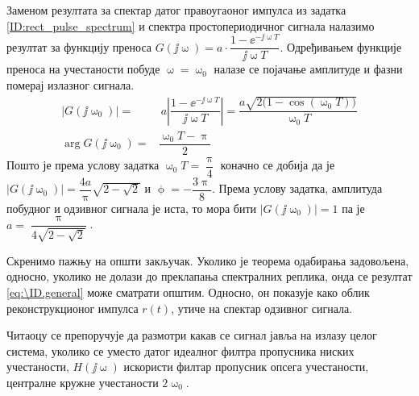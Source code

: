 Заменом резултата за спектар датог правоугаоног импулса из задатка \ref{ID:rect_pulse_spectrum}
и спектра простопериодичног сигнала налазимо резултат за функцију преноса 
${G(\jj\upomega) = a \cdot \dfrac{1 - \ee^{-\jj\upomega T} }{\jj\upomega T}}$. Одређивањем функције преноса на учестаности
побуде $\upomega = \upomega_0$ налазе се појачање амплитуде и фазни померај излазног сигнала.  
\begin{align}
    |G(\jj\upomega_0)| = &\ a \left| \dfrac{1 - \ee^{-\jj\upomega T} }{\jj\upomega T} \right| = 
    \dfrac{ a\sqrt{2\bigl(1 - \cos(\upomega_0 T)\bigr)} }{\upomega_0 T} \\
    \arg G(\jj\upomega_0) = & \dfrac{\upomega_0 T - \uppi}{2} 
\end{align}
Пошто је према услову задатка $\upomega_0 T = \dfrac{\uppi}{4}$ коначно се добија да је 
$|G(\jj\upomega_0)| = \dfrac{4a}{\uppi} \sqrt{2 - \sqrt {2}}$ и $\upphi = -\dfrac{3\uppi}{8}$. Према услову задатка, 
амплитуда побудног и одзивног сигнала је иста, то мора бити $|G(\jj\upomega_0)| = 1$ па је 
$a = \dfrac{\uppi} { 4 \sqrt{2 - \sqrt {2}} }$.

Скренимо пажњу на општи закључак. Уколико је теорема одабирања задовољена, односно, уколико не долази до преклапања 
спектралних реплика, онда се резултат \ref{eq:\ID.general} може сматрати општим. Односно, он показује како облик 
реконструкционог импулса $r(t)$, утиче на спектар одзивног сигнала. 

Читаоцу се препоручује
да размотри какав се сигнал јавља на излазу целог система, уколико се уместо датог идеалног филтра 
пропусника ниских учестаности, $H(\jj\upomega)$ искористи филтар пропусник опсега учестаности, централне кружне учестаности $2 \upomega_0$. 
